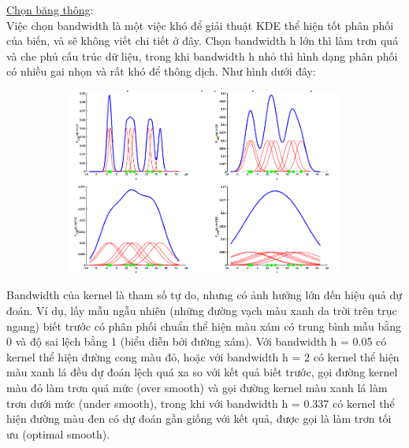 \documentclass[a4paper, 13pt]{report}
\begin{document}
\underline{Chọn băng thông}:\\
Việc chọn bandwidth là một việc khó để giải thuật KDE thể hiện tốt phân phối của biến, và sẽ không viết chi tiết ở đây. Chọn bandwidth h lớn thì làm trơn quá và che phủ cấu trúc dữ liệu, trong khi bandwidth h nhỏ thì hình dạng phân phối có nhiều gai nhọn và rất khó để thông dịch. Như hình dưới đây:
\FloatBarrier
\begin{figure}[!h]
  \begin{subfigure}[b]{0.7\textwidth}
	   \label{tab:example}
        \includegraphics[width=\linewidth]{KDE2}
  \end{subfigure}%
\end{figure}
\FloatBarrier
Bandwidth của kernel là tham số tự do, nhưng có ảnh hưởng lớn đến hiệu quả dự đoán. Ví dụ, lấy mẫu ngẫu nhiên (những đường vạch màu xanh da trời trên trục ngang) biết trước có phân phối chuẩn thể hiện màu xám có trung bình mẫu bằng 0 và độ sai lệch bằng 1 (biểu diễn bởi đường xám). Với bandwidth h = 0.05 có kernel thể hiện đường cong màu đỏ, hoặc với bandwidth h = 2 có kernel thể hiện màu xanh lá đều dự đoán lệch quá xa so với kết quả biết trước, gọi đường kernel màu đỏ làm trơn quá mức (over smooth) và gọi đường kernel màu xanh lá làm trơn dưới mức (under smooth), trong khi với bandwidth h = 0.337 có kernel thể hiện đường màu đen có dự đoán gần giống với kết quả, được gọi là làm trơn tối ưu (optimal smooth).\\
\FloatBarrier
\end{document}
